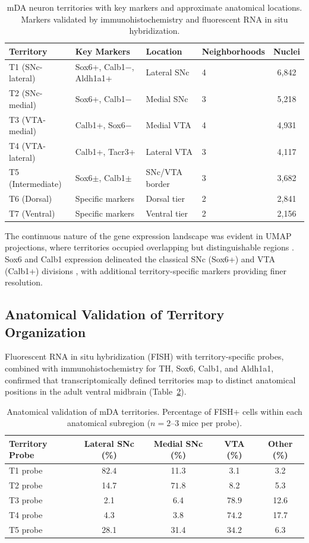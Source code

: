 \documentclass[11pt]{article}
\begin{document}
\begin{table}[H]
\centering
\caption{mDA neuron territories with key markers and approximate anatomical locations. Markers validated by immunohistochemistry and fluorescent RNA in situ hybridization.}
\label{tab:territories}
\begin{tabular}{llllc}
\toprule
Territory & Key Markers & Location & Neighborhoods & Nuclei \\
\midrule
T1 (SNc-lateral) & Sox6+, Calb1$-$, Aldh1a1+ & Lateral SNc & 4 & 6,842 \\
T2 (SNc-medial) & Sox6+, Calb1$-$ & Medial SNc & 3 & 5,218 \\
T3 (VTA-medial) & Calb1+, Sox6$-$ & Medial VTA & 4 & 4,931 \\
T4 (VTA-lateral) & Calb1+, Tacr3+ & Lateral VTA & 3 & 4,117 \\
T5 (Intermediate) & Sox6$\pm$, Calb1$\pm$ & SNc/VTA border & 3 & 3,682 \\
T6 (Dorsal) & Specific markers & Dorsal tier & 2 & 2,841 \\
T7 (Ventral) & Specific markers & Ventral tier & 2 & 2,156 \\
\bottomrule
\end{tabular}
\end{table}

The continuous nature of the gene expression landscape was evident in UMAP projections, where territories occupied overlapping but distinguishable regions \citep{umap_mcinnes2018}. Sox6 and Calb1 expression delineated the classical SNc (Sox6+) and VTA (Calb1+) divisions \citep{sox6_calb1_markers2015}, with additional territory-specific markers providing finer resolution.

\subsection{Anatomical Validation of Territory Organization}

Fluorescent RNA in situ hybridization (FISH) with territory-specific probes, combined with immunohistochemistry for TH, Sox6, Calb1, and Aldh1a1, confirmed that transcriptomically defined territories map to distinct anatomical positions in the adult ventral midbrain (Table~\ref{tab:anatomy}).

\begin{table}[H]
\centering
\caption{Anatomical validation of mDA territories. Percentage of FISH+ cells within each anatomical subregion ($n = 2$--3 mice per probe).}
\label{tab:anatomy}
\begin{tabular}{lcccc}
\toprule
Territory Probe & Lateral SNc (\%) & Medial SNc (\%) & VTA (\%) & Other (\%) \\
\midrule
T1 probe & $\mathbf{82.4}$ & 11.3 & 3.1 & 3.2 \\
T2 probe & 14.7 & $\mathbf{71.8}$ & 8.2 & 5.3 \\
T3 probe & 2.1 & 6.4 & $\mathbf{78.9}$ & 12.6 \\
T4 probe & 4.3 & 3.8 & $\mathbf{74.2}$ & 17.7 \\
T5 probe & 28.1 & 31.4 & $\mathbf{34.2}$ & 6.3 \\
\bottomrule
\end{tabular}
\end{table}
\end{document}

